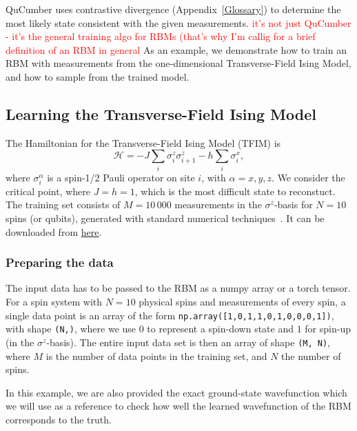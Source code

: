 \documentclass[submission, Phys]{SciPost}
\begin{document}
QuCumber uses contrastive divergence (Appendix~\ref{Glossary}) to determine the most likely state consistent with the given measurements.
\textcolor{red}{it's not just QuCumber - it's the general training algo for RBMs (that's why I'm callig for a brief definition of an RBM in general}
As an example, we demonstrate how to train an RBM with measurements from the one-dimensional Transverse-Field Ising Model, 
and how to sample from the trained model.

\subsection{Learning the Transverse-Field Ising Model}
\label{Sec:Training_TFIM}

The Hamiltonian for the Transverse-Field Ising Model (TFIM) is
\begin{equation}
	\mathcal{H} = -J\sum_i \sigma^z_i \sigma^z_{i+1} - h \sum_i \sigma^x_i, \label{TFIM}
\end{equation}
where $\sigma^{\alpha}_i$ is a spin-1/2 Pauli operator on site $i$, with $\alpha=x,y,z$. 
We consider the critical point, where $J=h=1$, which is the most difficult state to reconstuct.
The training set consists of $M=10\,000$ measurements in the $\sigma^z$-basis for $N=10$ spins (or qubits), 
generated with standard numerical techniques~\cite{itensor}. It can be downloaded from 
\href{https://github.com/PIQuIL/QuCumber/blob/master/examples/01_Ising/tfim1d_train_samples.txt}{here}.

\subsubsection{Preparing the data}
\label{subsec:example}

The input data has to be passed to the RBM as a numpy array or a torch tensor.
For a spin system with $N=10$ physical spins and measurements of every spin, 
a single data point is an array of the form \verb|np.array([1,0,1,1,0,1,0,0,0,1])|, with shape \verb|(N,)|,
where we use $0$ to represent a spin-down state and $1$ for spin-up (in the $\sigma^z$-basis). 
The entire input data set is then an array of shape \verb|(M, N)|, 
where $M$ is the number of data points in the training set, and $N$ the number of spins.

In this example, we are also provided the exact ground-state wavefunction 
which we will use as a reference to check how well the learned wavefunction of the RBM corresponds to the truth.
\end{document}
